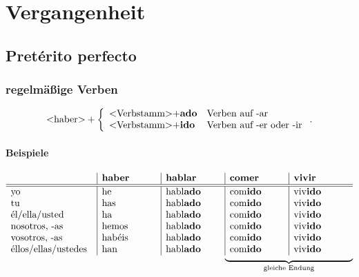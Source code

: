 \documentclass{../spanish_summary}
\begin{document}
  \chapter*{Vergangenheit}
    \section*{Pretérito perfecto}
      \subsection*{regelmäßige Verben}
        \[
           \text{<haber>} + \left\{\begin{array}{ll} \text{<Verbstamm>+\textbf{ado}} & \text{Verben auf -ar} \\
               \text{<Verbstamm>+\textbf{ido}} & \text{Verben auf -er oder -ir} \end{array}\right. .
        \]  
      
      \subsubsection*{Beispiele}
        \[
          \begin{array}{p{3cm}|p{2cm}|p{2cm}|p{2cm}|p{2cm}}
              ~
            & \text{\textbf{haber}}
            & \text{\textbf{hablar}}
            & \text{\textbf{comer}}
            & \text{\textbf{vivir}} \\ \hline
            \hline
            \text{yo} & \text{he} & \text{habl\textbf{ado}} & \text{com\textbf{ido}} & \text{viv\textbf{ido}} \\
            \text{tu} & \text{has} & \text{habl\textbf{ado}} & \text{com\textbf{ido}} & \text{viv\textbf{ido}} \\
            \text{él/ella/usted} & \text{ha} & \text{habl\textbf{ado}} & \text{com\textbf{ido}} & \text{viv\textbf{ido}} \\
            \text{nosotros, -as} & \text{hemos} & \text{habl\textbf{ado}} & \text{com\textbf{ido}} & \text{viv\textbf{ido}} \\
            \text{vosotros, -as} & \text{habéis} & \text{habl\textbf{ado}} & \text{com\textbf{ido}} & \text{viv\textbf{ido}}\\
            \text{éllos/ellas/ustedes} & \text{han} & \text{habl\textbf{ado}} & \text{com\textbf{ido}} & \text{viv\textbf{ido}}\\

            \multicolumn{1}{p{2cm}}{} & \multicolumn{1}{p{2cm}}{} & \multicolumn{1}{p{2cm}}{} & \multicolumn{2}{@{}l@{}}{%
              \raisebox{.5\normalbaselineskip}{%
              \rlap{$\underbrace{\hphantom{\mbox{\text{~~~~~~~~~~~~~~~~~}\hspace*{\dimexpr4\arraycolsep+\arrayrulewidth}\text{~~~~~~~~~~~~~~~~~}}}}_{\text{gleiche Endung}}$}}%
            }
          \end{array}
        \]      
\end{document}
